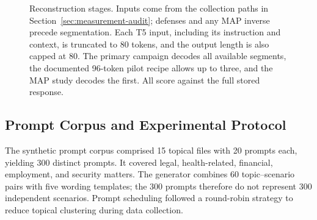 \documentclass[electronics,article,submit,pdftex,moreauthors]{Definitions/mdpi}
\begin{document}
\begin{figure}[ht]
\centering
{}
\caption{Reconstruction stages. Inputs come from the collection paths in Section~\ref{sec:measurement-audit}; defenses and any MAP inverse precede segmentation. Each T5 input, including its instruction and context, is truncated to 80 tokens, and the output length is also capped at 80. The primary campaign decodes all available segments, the documented 96-token pilot recipe allows up to three, and the MAP study decodes the first. All score against the full stored response.}
\label{fig:pipeline}
\end{figure}

\subsection{Prompt Corpus and Experimental Protocol}
The synthetic prompt corpus comprised 15 topical files with 20 prompts each, yielding 300 distinct prompts. It covered legal, health-related, financial, employment, and security matters. The generator combines 60 topic--scenario pairs with five wording templates; the 300 prompts therefore do not represent 300 independent scenarios. Prompt scheduling followed a round-robin strategy to reduce topical clustering during data collection.
\end{document}
